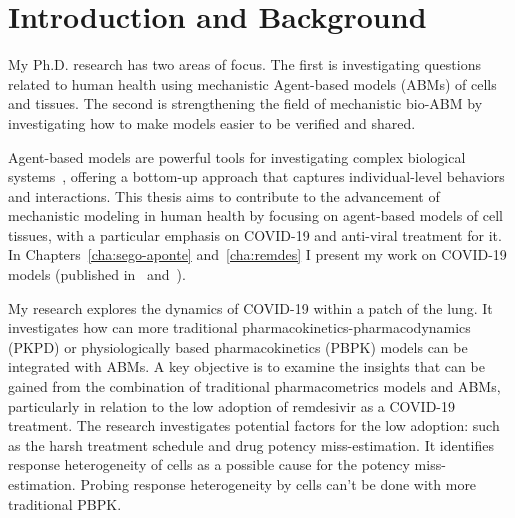 \chapter{Introduction and Background}\label{cha:intro}

My Ph.D. research has two areas of focus. The first is investigating questions related to human health using mechanistic Agent-based models (ABMs) of cells and tissues. The second is strengthening the field of mechanistic bio-ABM by investigating how to make models easier to be verified and shared. 


Agent-based models are powerful tools for investigating complex biological systems~\cite{sego_modular_2020, ferrari_gianlupi_multiscale_2022, sego_generation_2021, sego2022multiscale, 10.1371/journal.pone.0033726, ozik_high-throughput_2018, graner1992simulation,hester2011multi,adhyapok2021mechanical}, offering a bottom-up approach that captures individual-level behaviors and interactions.  This thesis aims to contribute to the advancement of mechanistic modeling in human health by focusing on agent-based models of cell tissues, with a particular emphasis on COVID-19 and anti-viral treatment for it. In Chapters~\ref{cha:sego-aponte} and~\ref{cha:remdes} I present my work on COVID-19 models (published in~\cite{sego_modular_2020} and~\cite{ferrari_gianlupi_multiscale_2022}).

My research explores the dynamics of COVID-19 within a patch of the lung. It investigates how can more traditional pharmacokinetics-pharmacodynamics (PKPD) or physiologically based pharmacokinetics (PBPK) models can be integrated with  ABMs. A key objective is to examine the insights that can be gained from the combination of traditional pharmacometrics models and ABMs, particularly in relation to the low adoption of remdesivir as a COVID-19 treatment. The research investigates potential factors for the low adoption: such as the harsh treatment schedule and drug potency miss-estimation. It identifies response heterogeneity of cells as a possible cause for the potency miss-estimation. Probing response heterogeneity by cells can't be done with more traditional PBPK. 

